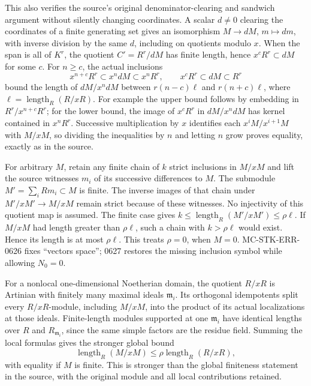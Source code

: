 This also verifies the source's original denominator-clearing and sandwich argument without silently changing coordinates. A scalar \(d\ne0\) clearing the coordinates of a finite generating set gives an isomorphism \(M\to dM\), \(m\mapsto dm\), with inverse division by the same \(d\), including on quotients modulo \(x\). When the span is all of \(K^r\), the quotient \(C'=R^r/dM\) has finite length, hence \(x^cR^r\subset dM\) for some \(c\). For \(n\ge c\), the actual inclusions \[
 x^{n+c}R^r\subset x^n dM\subset x^nR^r,\qquad
 x^cR^r\subset dM\subset R^r
\] bound the length of \(dM/x^ndM\) between \(r(n-c)\ell\) and \(r(n+c)\ell\), where \(\ell=\operatorname{length}_R(R/xR)\). For example the upper bound follows by embedding in \(R^r/x^{n+c}R^r\); for the lower bound, the image of \(x^cR^r\) in \(dM/x^ndM\) has kernel contained in \(x^nR^r\). Successive multiplication by \(x\) identifies each \(x^iM/x^{i+1}M\) with \(M/xM\), so dividing the inequalities by \(n\) and letting \(n\) grow proves equality, exactly as in the source.

For arbitrary \(M\), retain any finite chain of \(k\) strict inclusions in \(M/xM\) and lift the source witnesses \(m_i\) of its successive differences to \(M\). The submodule \(M'=\sum_iRm_i\subset M\) is finite. The inverse images of that chain under \(M'/xM'\to M/xM\) remain strict because of these witnesses. No injectivity of this quotient map is assumed. The finite case gives \(k\le\operatorname{length}_R(M'/xM')\le\rho\ell\). If \(M/xM\) had length greater than \(\rho\ell\), such a chain with \(k>\rho\ell\) would exist. Hence its length is at most \(\rho\ell\). This treats \(\rho=0\), when \(M=0\). MC-STK-ERR-0626 fixes ``vectors space''; 0627 restores the missing inclusion symbol while allowing \(N_0=0\).

For a nonlocal one-dimensional Noetherian domain, the quotient \(R/xR\) is Artinian with finitely many maximal ideals \(\mathfrak m_i\). Its orthogonal idempotents split every \(R/xR\)-module, including \(M/xM\), into the product of its actual localizations at those ideals. Finite-length modules supported at one \(\mathfrak m_i\) have identical lengths over \(R\) and \(R_{\mathfrak m_i}\), since the same simple factors are the residue field. Summing the local formulas gives the stronger global bound \[
 \operatorname{length}_R(M/xM)
 \le \rho\operatorname{length}_R(R/xR),
\] with equality if \(M\) is finite. This is stronger than the global finiteness statement in the source, with the original module and all local contributions retained.


